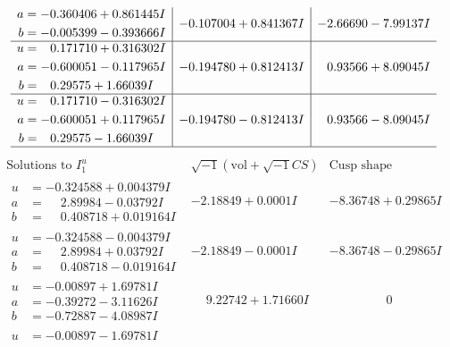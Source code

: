 \documentclass[1p]{elsarticle_modified}
\theoremstyle{definition}
\newcommand{\I}{\sqrt{-1}}
\begin{document}
$$\begin{array}{c|c|c}
\begin{aligned}
a &= -0.360406 + 0.861445 I \\
b &= -0.005399 - 0.393666 I\end{aligned}
 & -0.107004 + 0.841367 I & -2.66690 - 7.99137 I \\ \hline\begin{aligned}
u &= \phantom{-}0.171710 + 0.316302 I \\
a &= -0.600051 - 0.117965 I \\
b &= \phantom{-}0.29575 + 1.66039 I\end{aligned}
 & -0.194780 + 0.812413 I & \phantom{-}0.93566 + 8.09045 I \\ \hline\begin{aligned}
u &= \phantom{-}0.171710 - 0.316302 I \\
a &= -0.600051 + 0.117965 I \\
b &= \phantom{-}0.29575 - 1.66039 I\end{aligned}
 & -0.194780 - 0.812413 I & \phantom{-}0.93566 - 8.09045 I\\
 \hline 
 \end{array}$$\newpage$$\begin{array}{c|c|c}  
\text{Solutions to }I^u_{1}& \I (\text{vol} + \sqrt{-1}CS) & \text{Cusp shape}\\
 \hline 
\begin{aligned}
u &= -0.324588 + 0.004379 I \\
a &= \phantom{-}2.89984 - 0.03792 I \\
b &= \phantom{-}0.408718 + 0.019164 I\end{aligned}
 & -2.18849 + 0.0001 I & -8.36748 + 0.29865 I \\ \hline\begin{aligned}
u &= -0.324588 - 0.004379 I \\
a &= \phantom{-}2.89984 + 0.03792 I \\
b &= \phantom{-}0.408718 - 0.019164 I\end{aligned}
 & -2.18849 - 0.0001 I & -8.36748 - 0.29865 I \\ \hline\begin{aligned}
u &= -0.00897 + 1.69781 I \\
a &= -0.39272 - 3.11626 I \\
b &= -0.72887 - 4.08987 I\end{aligned}
 & \phantom{-}9.22742 + 1.71660 I & \phantom{-0.000000 } 0 \\ \hline\begin{aligned}
u &= -0.00897 - 1.69781 I \\

\end{aligned}
\end{array}$$
\end{document}
